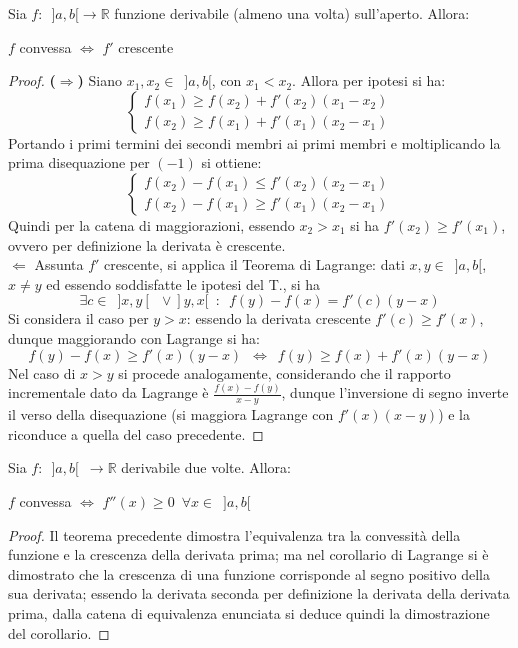 \documentclass[10pt]{article}
\theoremstyle{plain}
\begin{document}
\begin{ther}
Sia $f : \enspace ]a, b[ \rightarrow \mathbb{R}$ funzione derivabile (almeno una volta) sull'aperto. Allora:
\begin{center}
    $f$ convessa $\Longleftrightarrow$ $f'$ crescente
\end{center}
\end{ther}
\begin{proof}
\textbf{($\Rightarrow$)} Siano $x_1, x_2 \in \enspace ]a, b[$, con $x_1 < x_2$. Allora per ipotesi si ha:
\[\begin{cases}
f(x_1) \geq f(x_2) + f'(x_2) (x_1 - x_2) \\
f(x_2) \geq f(x_1) + f'(x_1) (x_2 - x_1) 
\end{cases}\]
Portando i primi termini dei secondi membri ai primi membri e moltiplicando la prima disequazione per $(-1)$ si ottiene:
\[\begin{cases}
f(x_2) - f(x_1) \leq f'(x_2) (x_2 - x_1) \\
f(x_2) - f(x_1) \geq f'(x_1) (x_2 - x_1) 
\end{cases}\]
Quindi per la catena di maggiorazioni, essendo $x_2 > x_1$ si ha $f'(x_2) \geq f'(x_1)$, ovvero per definizione la derivata è crescente.\\
\textbf{$\Leftarrow$} Assunta $f'$ crescente, si applica il Teorema di Lagrange: dati $x, y \in \enspace ]a, b[$, $x \neq y$ ed essendo soddisfatte le ipotesi del T., si ha
\[\exists c \in \enspace ]x, y[ \enspace \lor ]y, x[ \enspace : \enspace f(y) - f(x) = f'(c) (y - x)\]
Si considera il caso per $y > x$: essendo la derivata crescente $f'(c) \geq f'(x)$, dunque maggiorando con Lagrange si ha:
\[f(y) - f(x) \geq f'(x) (y - x) \enspace \Leftrightarrow \enspace f(y) \geq f(x) + f'(x) (y - x)\]
Nel caso di $x > y$ si procede analogamente, considerando che il rapporto incrementale dato da Lagrange è $\frac{f(x) - f(y)}{x - y}$, dunque l'inversione di segno inverte il verso della disequazione (si maggiora Lagrange con $f'(x) (x - y)$) e la riconduce a quella del caso precedente.
\end{proof}

\begin{cor}
Sia $f : \enspace ]a, b[ \enspace \rightarrow \mathbb{R}$ derivabile due volte. Allora:
\begin{center}
$f$ convessa $\Longleftrightarrow$ $f''(x) \geq 0 \enspace \forall x \in \enspace ]a, b[$
\end{center}
\end{cor}
\begin{proof}
Il teorema precedente dimostra l'equivalenza tra la convessità della funzione e la crescenza della derivata prima; ma nel corollario di Lagrange si è dimostrato che la crescenza di una funzione corrisponde al segno positivo della sua derivata; essendo la derivata seconda per definizione la derivata della derivata prima, dalla catena di equivalenza enunciata si deduce quindi la dimostrazione del corollario.
\end{proof}
\end{document}
